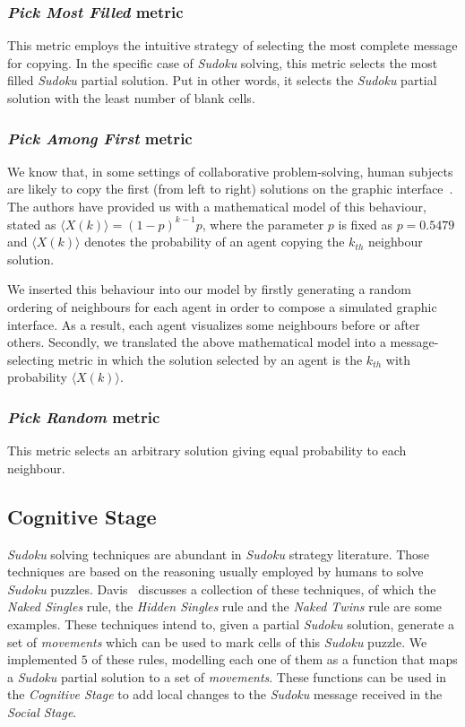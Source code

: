 \documentclass{article}
\begin{document}
\subsubsection{{\em Pick Most Filled} metric}

This metric employs the intuitive strategy of selecting the most complete message for copying. In the specific case of {\em Sudoku} solving, this metric selects the most filled {\em Sudoku} partial solution. Put in other words, it selects the {\em Sudoku} partial solution with the least number of blank cells.

\subsubsection{{\em Pick Among First} metric}

We know that, in some settings of collaborative problem-solving, human subjects are likely to copy the first (from left to right) solutions on the graphic interface~\cite{farenzena:collabem}. The authors have provided us with a mathematical model of this behaviour, stated as $\langle X(k)\rangle = (1-p)^{k-1}p$, where the parameter $p$ is fixed as $p = 0.5479$ and $\langle X(k)\rangle$ denotes the probability of an agent copying the $k_{th}$ neighbour solution.

We inserted this behaviour into our model by firstly generating a random ordering of neighbours for each agent in order to compose a simulated graphic interface. As a result, each agent visualizes some neighbours before or after others. Secondly, we translated the above mathematical model into a message-selecting metric in which the solution selected by an agent is the $k_{th}$ with probability $\langle X(k)\rangle$.

\subsubsection{{\em Pick Random} metric}

This metric selects an arbitrary solution giving equal probability to each neighbour.

\subsection{Cognitive Stage}

{\em Sudoku} solving techniques are abundant in {\em Sudoku} strategy literature. Those techniques are based on the reasoning usually employed by humans to solve \emph{Sudoku} puzzles. Davis~\cite{davis:mathsudoku} discusses a collection of these techniques, of which the {\em Naked Singles} rule, the {\em Hidden Singles} rule and the {\em Naked Twins} rule are some examples. These techniques intend to, given a partial {\em Sudoku} solution, generate a set of {\em movements} which can be used to mark cells of this {\em Sudoku} puzzle. We implemented $5$ of these rules, modelling each one of them as a function that maps a {\em Sudoku} partial solution to a set of {\em movements}. These functions can be used in the {\em Cognitive Stage} to add local changes to the {\em Sudoku} message received in the {\em Social Stage}.
\end{document}
